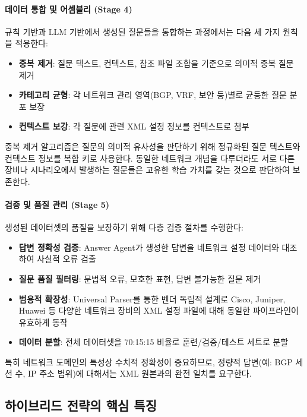 \documentclass[twocolumn, 10pt]{article}
\newcommand{\subsubsubsection}[1]{\paragraph{#1}}%
\renewcommand{\subsubsubsection}[1]{\paragraph{#1}}%
\begin{document}
\subsubsubsection{데이터 통합 및 어셈블리 (Stage 4)}

규칙 기반과 LLM 기반에서 생성된 질문들을 통합하는 과정에서는 다음 세 가지
원칙을 적용한다:

\begin{itemize}
\item \textbf{중복 제거}: 질문 텍스트, 컨텍스트, 참조 파일 조합을 기준으로 의미적
  중복 질문 제거

\item \textbf{카테고리 균형}: 각 네트워크 관리 영역(BGP, VRF, 보안 등)별로 균등한
  질문 분포 보장

\item \textbf{컨텍스트 보강}: 각 질문에 관련 XML 설정 정보를 컨텍스트로 첨부
\end{itemize}

중복 제거 알고리즘은 질문의 의미적 유사성을 판단하기 위해 정규화된 질문 텍스트와
컨텍스트 정보를 복합 키로 사용한다. 동일한 네트워크 개념을 다루더라도 서로
다른 장비나 시나리오에서 발생하는 질문들은 고유한 학습 가치를 갖는 것으로
판단하여 보존한다.

\subsubsubsection{검증 및 품질 관리 (Stage 5)}

생성된 데이터셋의 품질을 보장하기 위해 다층 검증 절차를 수행한다:

\begin{itemize}
\item \textbf{답변 정확성 검증}: Answer Agent가 생성한 답변을 네트워크 설정 데이터와
  대조하여 사실적 오류 검출

\item \textbf{질문 품질 필터링}: 문법적 오류, 모호한 표현, 답변 불가능한 질문
  제거

\item \textbf{범용적 확장성}: Universal Parser를 통한 벤더 독립적 설계로 Cisco,
  Juniper, Huawei 등 다양한 네트워크 장비의 XML 설정 파일에 대해 동일한 파이프라인이
  유효하게 동작

\item \textbf{데이터 분할}: 전체 데이터셋을 70:15:15 비율로 훈련/검증/테스트
  세트로 분할
\end{itemize}

특히 네트워크 도메인의 특성상 수치적 정확성이 중요하므로, 정량적 답변(예: BGP 세션
수, IP 주소 범위)에 대해서는 XML 원본과의 완전 일치를 요구한다.

\subsection{하이브리드 전략의 핵심 특징}
\end{document}

